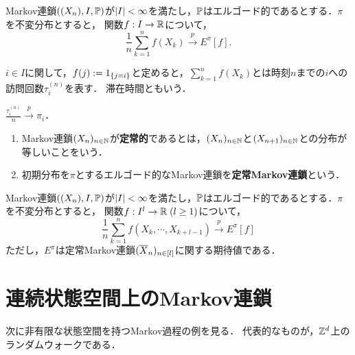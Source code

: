 \documentclass[uplatex,dvipdfmx]{jsreport}
\begin{document}
\begin{theorem}[大数の弱法則]\label{thm-law-of-large-number-of-Markov-chain}
    Markov連鎖$((X_n),I,\mathbb{P})$が$\lvert I\rvert<\infty$を満たし，$\mathbb{P}$はエルゴード的であるとする．$\pi$を不変分布とすると，
    関数$f:I\to\mathbb{R}$について，
    \[\frac{1}{n}\sum_{k=1}^nf(X_k)\xrightarrow{p}E^\pi[f].\]
\end{theorem}

\begin{definition}
    $i\in I$に関して，$f(j):=1_{\left\{j=i\right\}}$と定めると，$\sum^n_{k=1}f(X_k)$とは時刻$n$までの$i$への訪問回数$\tau^{(n)}_i$を表す．
    滞在時間ともいう．
\end{definition}

\begin{corollary}
    $\frac{\tau_i^{(n)}}{n}\xrightarrow{p}\pi_i$．
\end{corollary}

\begin{definition}[stationarity]\mbox{}
    \begin{enumerate}
        \item Markov連鎖$(X_n)_{n\in\mathbb{N}}$が\textbf{定常的}であるとは，$(X_n)_{n\in\mathbb{N}}$と$(X_{n+1})_{n\in\mathbb{N}}$との分布が等しいことをいう．
        \item 初期分布を$\pi$とするエルゴード的なMarkov連鎖を\textbf{定常Markov連鎖}という．
    \end{enumerate}
\end{definition}

\begin{theorem}[高次元化]
    Markov連鎖$((X_n),I,\mathbb{P})$が$\lvert I\rvert<\infty$を満たし，$\mathbb{P}$はエルゴード的であるとする．$\pi$を不変分布とすると，
    関数$f:I^l\to\mathbb{R}\;(l\ge1)$について，
    \[\frac{1}{n}\sum_{k=1}^nf(X_k,\cdots,X_{k+l-1})\xrightarrow{p}E^\pi[f]\]
    ただし，$E^\pi$は定常Markov連鎖$(\overline{X}_n)_{n\in[l]}$に関する期待値である．
\end{theorem}

\section{連続状態空間上のMarkov連鎖}

\begin{tcolorbox}[colframe=ForestGreen, colback=ForestGreen!10!white,breakable,colbacktitle=ForestGreen!40!white,coltitle=black,fonttitle=\bfseries\sffamily,
title=]
    次に非有限な状態空間を持つMarkov過程の例を見る．
    代表的なものが，$\mathbb{Z}^d$上のランダムウォークである．
\end{tcolorbox}
\end{document}
